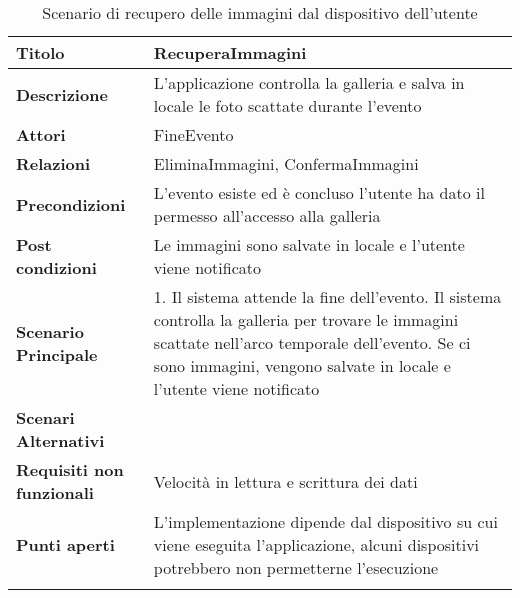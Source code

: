 \begin{longtable} {|P{4.5cm}|P{11cm}|}
    \hline
    \textbf{Titolo}                   & RecuperaImmagini                                                                                                                           \\
    \hline
    \textbf{Descrizione}              & L'applicazione controlla la galleria e salva in locale le foto scattate durante l'evento                                                   \\
    \hline
    \textbf{Attori}                   & FineEvento                                                                                                                                 \\
    \hline
    \textbf{Relazioni}                & EliminaImmagini, ConfermaImmagini                                                                                                          \\
    \hline
    \textbf{Precondizioni}            & L'evento esiste ed è concluso\newline
    l'utente ha dato il permesso all'accesso alla galleria                                                                                                                         \\
    \hline
    \textbf{Post condizioni}          & Le immagini sono salvate in locale e l'utente viene notificato                                                                             \\
    \hline
    \textbf{Scenario Principale}      & 1. Il sistema attende la fine dell'evento. Il sistema controlla la galleria per trovare le immagini scattate nell'arco temporale dell'evento. Se ci sono immagini, vengono salvate in locale e l'utente viene notificato                                                                                                  \\
    \hline
    \textbf{Scenari Alternativi}      &                                                                                                                                            \\
    \hline
    \textbf{Requisiti non funzionali} & Velocità in lettura e scrittura dei dati                                                                                                   \\
    \hline
    \textbf{Punti aperti}             & L'implementazione dipende dal dispositivo su cui viene eseguita l'applicazione, alcuni dispositivi potrebbero non permetterne l'esecuzione \\
    \hline


    \caption{Scenario di recupero delle immagini dal dispositivo dell'utente}
\end{longtable}

